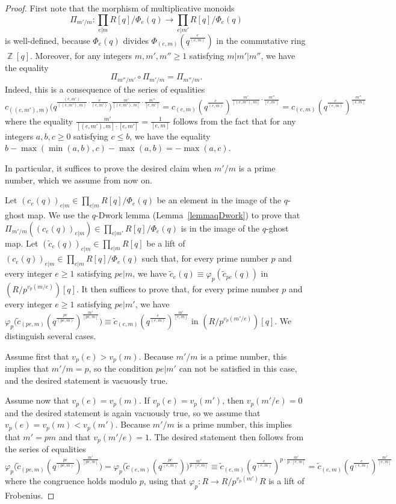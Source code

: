 \documentclass[10pt,twoside]{scrarticle}
\theoremstyle{definition}
\DeclareMathOperator{\Z}{\mathbb{Z}}
\renewcommand{\ge}{\geqslant}
\renewcommand{\le}{\leqslant}
\numberwithin{equation}{theorem}
\begin{document}
\begin{proof}
    First note that the morphism of multiplicative monoids $$\Pi_{m'/m} : \prod_{e|m} R[q]/\Phi_e(q) \rightarrow \prod_{e|m'} R[q]/\Phi_e(q)$$ is well-defined, because $\Phi_e(q)$ divides $\Phi_{(e,m)}(q^{\frac{e}{(e,m)}})$ in the commutative ring $\Z[q]$. Moreover, for any integers $m,m',m'' \ge 1$ satisfying $m|m'|m''$, we have the equality $$\Pi_{m''/m'} \circ \Pi_{m'/m} = \Pi_{m''/m}.$$ Indeed, this is a consequence of the series of equalities
    $$c_{((e,m'),m)}\big(q^{\frac{(e,m')}{((e,m'),m)}\cdot\frac{e}{(e,m')}}\big)^{\frac{m'}{[(e,m'),m]}\cdot\frac{m''}{[e,m']}} = c_{(e,m)}(q^{\frac{e}{(e,m)}})^{\frac{m'}{[(e,m'),m]}\cdot\frac{m''}{[e,m']}} = c_{(e,m)}(q^{\frac{e}{(e,m)}})^{\frac{m''}{[e,m]}}$$
    where the equality $\tfrac{m'}{[(e,m'),m]\cdot[e,m']}=\tfrac{1}{[e,m]}$ follows from the fact that for any integers $a,b,c \ge 0$ satisfying $c \le b$, we have the equality 
    $b-\max(\min(a,b),c)-\max(a,b)=-\max(a,c)$. 
    
    In particular, it suffices to prove the desired claim when $m'/m$ is a prime number, which we assume from now on.
    
    Let $(c_e(q))_{e|m} \in \prod_{e|m} R[q]/\Phi_e(q)$ be an element in the image of the $q$-ghost map. We use the $q$-Dwork lemma (Lemma~\ref{lemmaqDwork}) to prove that $\Pi_{m'/m}((c_e(q))_{e|m}) \in \prod_{e|m'} R[q]/\Phi_e(q)$ is in the image of the $q$-ghost map. Let $(\tilde{c}_e(q))_{e|m} \in \prod_{e|m} R[q]$ be a lift of $(c_e(q))_{e|m} \in \prod_{e|m} R[q]/\Phi_e(q)$ such that, for every prime number $p$ and every integer $e \ge 1$ satisfying $pe|m$, we have $\tilde{c}_e(q) \equiv \varphi_p(\tilde{c}_{pe}(q))$ in $(R/p^{v_p(m/e)})[q]$. It then suffices to prove that, for every prime number $p$ and every integer $e \ge 1$ satisfying $pe|m'$, we have $\varphi_p\big(\tilde{c}_{(pe,m)}(q^{\frac{pe}{(pe,m)}})^{\frac{m'}{[pe,m]}}\big) \equiv \tilde{c}_{(e,m)}(q^{\frac{e}{(e,m)}})^{\frac{m'}{[e,m]}}$ in $(R/p^{v_p(m'/e)})[q]$. We distinguish several cases.
    
    Assume first that $v_p(e)>v_p(m)$. Because $m'/m$ is a prime number, this implies that $m'/m=p$, so the condition $pe|m'$ can not be satisfied in this case,  
    and the desired statement is vacuously true.

    Assume now that $v_p(e)=v_p(m)$. If $v_p(e)=v_p(m')$, then $v_p(m'/e)=0$ and the desired statement is again vacuously true, so we assume that $v_p(e)=v_p(m)<v_p(m')$. Because $m'/m$ is a prime number, this implies that $m'=pm$ and that $v_p(m'/e)=1$. The desired statement then follows from the series of equalities
    $$\varphi_p\big(\tilde{c}_{(pe,m)}(q^{\frac{pe}{(pe,m)}})^{\frac{m'}{[pe,m]}}\big) = \varphi_p\big(\tilde{c}_{(e,m)}(q^{\frac{pe}{(e,m)}})\big)^{\frac{m'}{p\cdot[e,m]}} \equiv \tilde{c}_{(e,m)}(q^{\frac{e}{(e,m)}})^{p\cdot\frac{m'}{p\cdot [e,m]}} = \tilde{c}_{(e,m)}(q^{\frac{e}{(e,m)}})^{\frac{m'}{[e,m]}}$$
    where the congruence holds modulo $p$, using that $\varphi_p : R \rightarrow R/p^{v_p(m')}R$ is a lift of Frobenius. 


\end{proof}
\end{document}
